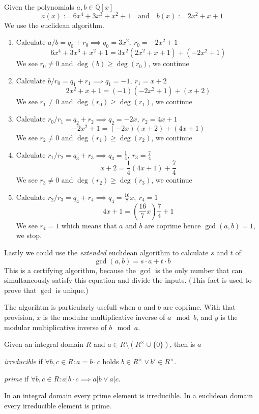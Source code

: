 \begin{example}
   Given the polynomials \(a, b \in \mathbb{Q}[x]\)
   \[a(x) := 6x^4 + 3x^3 + x^2 + 1 \quad\text{and}\quad b(x) := 2x^2 + x + 1\]
   We use the euclidean algorithm.

   \begin{enumerate}
      \item Calculate \(a / b = q_0 + r_0 \implies q_0 = 3x^2,~r_0 = -2x^2 + 1\)
         \[6x^4 + 3x^3 + x^2 + 1 = 3x^2 (2x^2 + x + 1) + (-2x^2 + 1)\]
         We see \(r_0 \neq 0\) and \(\deg(b) \geq \deg(r_0)\), we continue
      \item Calculate \(b / r_0 = q_1 + r_1 \implies q_1 = -1,~r_1 = x+2\)
         \[2x^2 + x + 1 = (-1) (-2x^2 + 1) + (x + 2)\]
         We see \(r_1 \neq 0\) and \(\deg(r_0) \geq \deg(r_1)\), we continue
      \item Calculate \(r_0 / r_1 = q_2 + r_2 \implies q_2 = -2x,~r_2 = 4x+1\)
         \[-2x^2 + 1 = (-2x) (x+2) + (4x + 1)\]
         We see \(r_2 \neq 0\) and \(\deg(r_1) \geq \deg(r_2)\), we continue
      \item Calculate \(r_1 / r_2 = q_3 + r_3 \implies q_3 = \frac{1}{4},~r_3 = \frac{7}{4}\)
         \[x + 2 = \frac{1}{4} (4x + 1) + \frac{7}{4}\]
         We see \(r_3 \neq 0\) and \(\deg(r_2) \geq \deg(r_3)\), we continue
      \item Calculate \(r_2 / r_3 = q_4 + r_4 \implies q_4 = \frac{16}{7}x,~r_4 = 1\)
         \[4x + 1 = \left(\frac{16}{7}x\right) \frac{7}{4} + 1\]
         We see \(r_4 = 1\) which means that \(a\) and \(b\) are coprime hence \(\gcd(a, b) = 1\), we stop.
   \end{enumerate}
\end{example}
\begin{remark}
   Lastly we could use the \textit{extended} euclidean algorithm to calculate \(s\) and \(t\) of
   \[\gcd(a, b) = s \cdot a + t \cdot b\]
   This is a certifying algorithm, because the \(\gcd\) is the only number that can simultaneously satisfy this equation and divide the inputs.
   (This fact is used to prove that \(\gcd\) is unique.)

   The algorihtm is particularly usefull when \(a\) and \(b\) are coprime.
   With that provision, \(x\) is the modular multiplicative inverse of \(a \mod b\), and \(y\) is the modular multiplicative inverse of \(b \mod a\).
\end{remark}

\begin{definition}
   Given an integral domain \(R\) and \(a \in R \setminus (R^{\times} \cup \{0\})\), then is \(a\)

   \emph{irreducible} if \(\forall b, c \in R: a = b \cdot c\) holds \(b \in R^{\times} \lor b' \in R^{\times}\).

   \emph{prime} if \(\forall b, c \in R: a | b \cdot c \implies a | b \lor a | c\).
\end{definition}
\begin{remark}
   In an integral domain every prime element is irreducible.
   In a euclidean domain every irreducible element is prime.
\end{remark}

